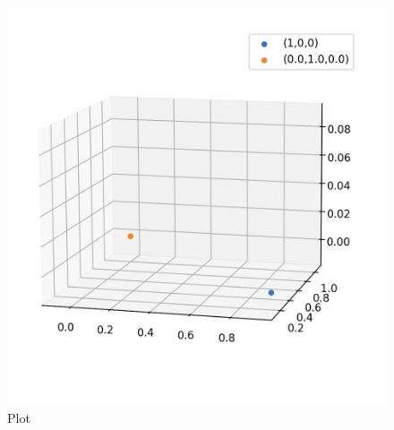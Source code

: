 \documentclass[12pt]{article}
\begin{document}
\begin{figure}[H]
    \centering
    \includegraphics[width=0.8\columnwidth]{Figs/12122.png}
    \caption{Plot}
    \label{fig:placeholder}
\end{figure}
\end{document}
